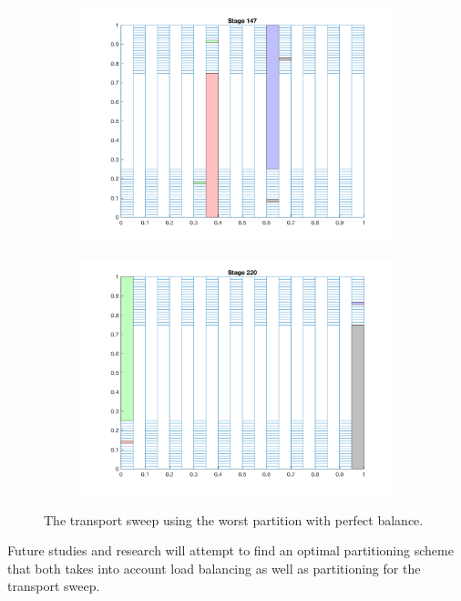 \documentclass[letterpaper]{mandc2019}
\begin{document}
\begin{figure}[H]
\begin{subfigure}{0.49\textwidth}
  \includegraphics[scale=0.5]{figures/worst_partition_3.png}
  \end{subfigure}
  \begin{subfigure}{0.49\textwidth}
  \includegraphics[scale=0.5]{figures/worst_partition_4.png}
  \end{subfigure}
  \caption{The transport sweep using the worst partition with perfect balance.}
  \label{worst_partition}
\end{figure}

Future studies and research will attempt to find an optimal partitioning scheme that both takes into account load balancing as well as partitioning for the transport sweep.

 \setlength{\baselineskip}{12pt}
 
 
\end{document}

